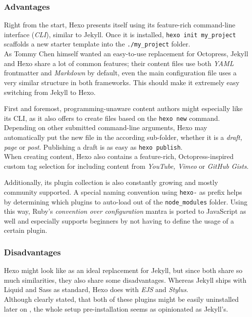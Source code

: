 \subsubsection{Advantages}
Right from the start, Hexo presents itself using its feature-rich command-line interface (\emph{CLI}), similar to Jekyll. Once it is installed, \texttt{hexo init my\_project} scaffolds a new starter template into the \texttt{./my\_project} folder.\\
As Tommy Chen himself wanted an easy-to-use replacement for Octopress, Jekyll and Hexo share a lot of common features; their content files use both \emph{YAML} frontmatter and \emph{Markdown} by default, even the main configuration file uses a very similar structure in both frameworks. This should make it extremely easy switching from Jekyll to Hexo.

First and foremost, programming-unaware content authors might especially like its CLI, as it also offers to create files based on the \texttt{hexo new} command. Depending on other submitted command-line arguments, Hexo may automatically put the new file in the according sub-folder, whether it is a \emph{draft, page} or \emph{post}. Publishing a draft is as easy as \texttt{hexo publish}.\\
When creating content, Hexo also contains a feature-rich, Octopress-inspired custom tag selection for including content from \emph{YouTube, Vimeo} or \emph{GitHub Gists}.

Additionally, its plugin collection is also constantly growing and mostly community supported. A special naming convention using \texttt{hexo-} as prefix helps by determining which plugins to auto-load out of the \texttt{node\_modules} folder. Using this way, Ruby's \emph{convention over configuration} mantra is ported to JavaScript as well and especially supports beginners by not having to define the usage of a certain plugin.

\subsubsection{Disadvantages}
Hexo might look like as an ideal replacement for Jekyll, but since both share so much similarities, they also share some disadvantages. Whereas Jekyll ships with Liquid and Sass as standard, Hexo does with \emph{EJS} and \emph{Stylus}.\\
Although clearly stated, that both of these plugins might be easily uninstalled later on \cite{HexoDocumentationSetup}, the whole setup pre-installation seems as opinionated as Jekyll's.

